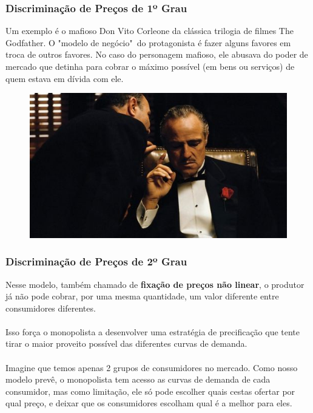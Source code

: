 \documentclass{beamer}[10]
\begin{document}
\begin{frame}
	\frametitle{Discriminação de Preços de 1º Grau}

	Um exemplo é o mafioso Don Vito Corleone da clássica trilogia de filmes The Godfather. O "modelo de negócio"\ do protagonista é fazer alguns favores em troca de outros favores. No caso do personagem mafioso, ele abusava do poder de mercado que detinha para cobrar o máximo possível (em bens ou serviços) de quem estava em dívida com ele.

	\begin{figure}[H]
		\centering
		\includegraphics[scale=0.3]{cap26_2-don_corleone.jpeg}
	\end{figure}

\end{frame}

\begin{frame}
	\frametitle{Discriminação de Preços de 2º Grau}

	Nesse modelo, também chamado de \textbf{fixação de preços não linear}, o produtor já não pode cobrar, por uma mesma quantidade, um valor diferente entre consumidores diferentes.
	\\~\\
	Isso força o monopolista a desenvolver uma estratégia de precificação que tente tirar o maior proveito possível das diferentes curvas de demanda.
	\\~\\
	Imagine que temos apenas 2 grupos de consumidores no mercado. Como nosso modelo prevê, o monopolista tem acesso as curvas de demanda de cada consumidor, mas como limitação, ele só pode escolher quais cestas ofertar por qual preço, e deixar que os consumidores escolham qual é a melhor para eles.

\end{frame}
\end{document}
